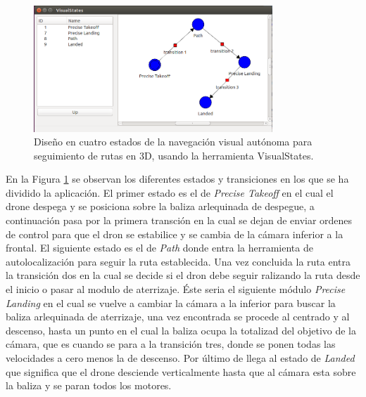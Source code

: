\begin{figure}[H]
	\begin{center}
		\includegraphics[width=0.8\textwidth]{imag/IMG60.png}
				\caption{Diseño en cuatro estados de la navegación visual autónoma para seguimiento de rutas en 3D, usando la herramienta VisualStates.}
		\label{fig:Esquema VisualStates.}	
	\end{center}
\end{figure}

\hspace{1cm} En la Figura \ref{fig:Esquema VisualStates.} se observan los diferentes estados y transiciones en los que se ha dividido la aplicación. El primer estado es el de \textit{Precise Takeoff} en el cual el drone despega y se posiciona sobre la baliza arlequinada de despegue, a continuación pasa por la primera transción en la cual se dejan de enviar ordenes de control para que el dron se estabilice y se cambia de la cámara inferior a la frontal. El siguiente estado es el de \textit{Path} donde entra la herramienta de autolocalización para seguir la ruta establecida. Una vez concluida la ruta entra la transición dos en la cual se decide si el dron debe seguir ralizando la ruta desde el inicio o pasar al modulo de aterrizaje. Éste seria el siguiente módulo \textit{Precise Landing} en el cual se vuelve a cambiar la cámara a la inferior para buscar la baliza arlequinada de aterrizaje, una vez encontrada se procede al centrado y al descenso, hasta un punto en el cual la baliza ocupa la totalizad del objetivo de la cámara, que es cuando se para a la transición tres, donde se ponen todas las velocidades a cero menos la de descenso. Por último de llega al estado de \textit{Landed} que significa que el drone desciende verticalmente hasta que al cámara esta sobre la baliza y se paran todos los motores. 

